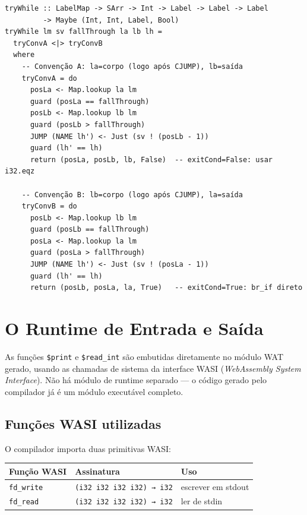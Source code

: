 \begin{verbatim}
tryWhile :: LabelMap -> SArr -> Int -> Label -> Label -> Label
         -> Maybe (Int, Int, Label, Bool)
tryWhile lm sv fallThrough la lb lh =
  tryConvA <|> tryConvB
  where
    -- Convenção A: la=corpo (logo após CJUMP), lb=saída
    tryConvA = do
      posLa <- Map.lookup la lm
      guard (posLa == fallThrough)
      posLb <- Map.lookup lb lm
      guard (posLb > fallThrough)
      JUMP (NAME lh') <- Just (sv ! (posLb - 1))
      guard (lh' == lh)
      return (posLa, posLb, lb, False)  -- exitCond=False: usar i32.eqz

    -- Convenção B: lb=corpo (logo após CJUMP), la=saída
    tryConvB = do
      posLb <- Map.lookup lb lm
      guard (posLb == fallThrough)
      posLa <- Map.lookup la lm
      guard (posLa > fallThrough)
      JUMP (NAME lh') <- Just (sv ! (posLa - 1))
      guard (lh' == lh)
      return (posLb, posLa, la, True)   -- exitCond=True: br_if direto
\end{verbatim}

\section{O Runtime de Entrada e Saída}\label{sec:wat-runtime}

As funções \texttt{\$print} e \texttt{\$read\_int} são embutidas diretamente no
módulo WAT gerado, usando as chamadas de sistema da interface WASI
(\emph{WebAssembly System Interface}).  Não há módulo de runtime separado — o
código gerado pelo compilador já é um módulo executável completo.

\subsection{Funções WASI utilizadas}

O compilador importa duas primitivas WASI:

\begin{center}
\begin{tabular}{lll}
\hline
\textbf{Função WASI} & \textbf{Assinatura} & \textbf{Uso} \\
\hline
\texttt{fd\_write} & \texttt{(i32 i32 i32 i32) → i32} & escrever em stdout \\
\texttt{fd\_read}  & \texttt{(i32 i32 i32 i32) → i32} & ler de stdin \\
\hline
\end{tabular}
\end{center}

